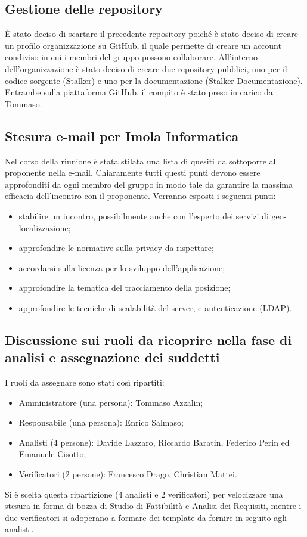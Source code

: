 \subsection{Gestione delle repository}
È stato deciso di scartare il precedente repository poiché è stato deciso di creare un profilo organizzazione su GitHub, il quale permette di creare un account condiviso in cui i membri del gruppo possono collaborare.
All'interno dell'organizzazione è stato deciso di creare due repository pubblici, uno per il codice sorgente (Stalker) e uno per la documentazione (Stalker-Documentazione).
Entrambe sulla piattaforma GitHub, il compito è stato preso in carico da Tommaso. 

\subsection{Stesura e-mail per Imola Informatica}
Nel corso della riunione è stata stilata una lista di quesiti da sottoporre al proponente nella e-mail. 
Chiaramente tutti questi punti devono essere approfonditi da ogni membro del gruppo in modo tale da garantire la massima efficacia dell'incontro con il proponente.
Verranno esposti i seguenti punti:
\begin{itemize}
\item stabilire un incontro, possibilmente anche con l'esperto dei servizi di geo-localizzazione;
\item approfondire le normative sulla privacy da rispettare;
\item accordarsi sulla licenza per lo sviluppo dell'applicazione;
\item approfondire la tematica del tracciamento della posizione;
\item approfondire le tecniche di scalabilità del server, e autenticazione (LDAP).
\end{itemize} 

\subsection{Discussione sui ruoli da ricoprire nella fase di analisi e assegnazione dei suddetti}
I ruoli da assegnare sono stati così ripartiti: 
\begin{itemize}
\item Amministratore (una persona): Tommaso Azzalin;
\item Responsabile (una persona): Enrico Salmaso;
\item Analisti (4 persone): Davide Lazzaro, Riccardo Baratin, Federico Perin ed Emanuele Cisotto;
\item Verificatori (2 persone): Francesco Drago, Christian Mattei.
\end{itemize}
Si è scelta questa ripartizione (4 analisti e 2 verificatori) per velocizzare una stesura in forma di bozza di Studio di Fattibilità e Analisi dei Requisiti, mentre i due verificatori si adoperano a formare dei template da fornire in seguito agli analisti.


